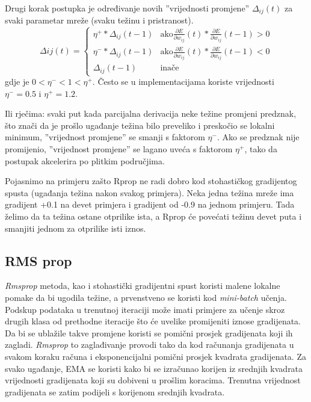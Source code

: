 \documentclass[times, utf8, diplomski, numeric]{fer}
\begin{document}
Drugi korak postupka je određivanje novih ''vrijednosti promjene'' $\Delta_{ij}(t)$ za svaki parametar mreže (svaku težinu i pristranost).
\begin{equation}
  \Delta{ij}(t) =
    \left\{
	    \begin{array}{ll}
		    \eta^{+} * \Delta_{ij}(t-1)  & \mbox{ako} \frac{\partial E}{\partial w_{ij}}(t) * \frac{\partial E}{\partial w_{ij}}(t-1) > 0 \\
		    \eta^{-} * \Delta_{ij}(t-1)  & \mbox{ako} \frac{\partial E}{\partial w_{ij}}(t) * \frac{\partial E}{\partial w_{ij}}(t-1) < 0\\
		    \Delta_{ij}(t-1)  & \mbox{inače}
	    \end{array}
    \right.
\end{equation}
gdje je $0 < \eta^{-} < 1 < \eta^{+}$. Često se u implementacijama koriste vrijednosti $\eta^{-} = 0.5$ i $\eta^{+} = 1.2$.

Ili rječima: svaki put kada parcijalna derivacija neke težine promjeni predznak, što znači da je prošlo ugađanje težina bilo preveliko i preskočio se lokalni minimum, ''vrijednost promjene'' se smanji s faktorom $\eta^{-}$. Ako se predznak nije promijenio, ''vrijednost promjene'' se lagano uveća s faktorom $\eta^{+}$, tako da postupak akcelerira po plitkim područjima.

Pojasnimo na primjeru zašto Rprop ne radi dobro kod stohastičkog gradijentog spusta (ugađanja težina nakon svakog primjera). Neka jedna težina mreže ima gradijent +0.1 na devet primjera i gradijent od -0.9 na jednom primjeru. Tada želimo da ta težina ostane otprilike ista, a Rprop će povećati težinu devet puta i smanjiti jednom za otprilike isti iznos.


\subsection{RMS prop}

\emph{Rmsprop} metoda, kao i stohastički gradijentni spust koristi malene lokalne pomake da bi ugodila težine, a prvenstveno se koristi kod \textit{mini-batch} učenja.
Podskup podataka u trenutnoj iteraciji može imati primjere za učenje skroz drugih klasa od prethodne iteracije što će uvelike promijeniti iznose gradijenata. Da bi se ublažile takve promjene koristi se pomični prosjek gradijenata koji ih zagladi.
\emph{Rmsprop} to zaglađivanje provodi tako da kod računanja gradijenata u svakom koraku računa i eksponencijalni pomični prosjek  kvadrata gradijenata. Za svako ugađanje, EMA se koristi kako bi se izračunao korijen iz srednjih kvadrata  vrijednosti gradijenata koji su dobiveni u prošlim koracima. Trenutna vrijednost gradijenata se zatim podijeli s korijenom srednjih kvadrata.
\end{document}
